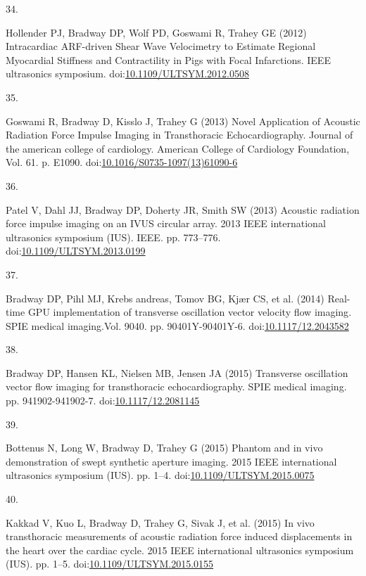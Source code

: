 \documentclass[
]{article}
\newlength{\cslhangindent}
\newlength{\csllabelwidth}
\newlength{\cslentryspacingunit} %
\newenvironment{CSLReferences}[2] %
 {%
  \setlength{\parindent}{0pt}
  \ifodd #1
  \let\oldpar\par
  \def\par{\hangindent=\cslhangindent\oldpar}
  \fi
  \setlength{\parskip}{#2\cslentryspacingunit}
 }%
 {}
\newcommand{\CSLLeftMargin}[1]{\parbox[t]{\csllabelwidth}{#1}}
\newcommand{\CSLRightInline}[1]{\parbox[t]{\linewidth - \csllabelwidth}{#1}\break}
\begin{document}
\begin{CSLReferences}{0}{0}
\leavevmode{}%
\CSLLeftMargin{34. }
\CSLRightInline{Hollender PJ, Bradway DP, Wolf PD, Goswami R, Trahey GE
(2012) {Intracardiac ARF-driven Shear Wave Velocimetry to Estimate
Regional Myocardial Stiffness and Contractility in Pigs with Focal
Infarctions}. IEEE ultrasonics symposium.
doi:\href{https://doi.org/10.1109/ULTSYM.2012.0508}{10.1109/ULTSYM.2012.0508}}

\leavevmode{}%
\CSLLeftMargin{35. }
\CSLRightInline{Goswami R, Bradway D, Kisslo J, Trahey G (2013) {Novel
Application of Acoustic Radiation Force Impulse Imaging in Transthoracic
Echocardiography}. Journal of the american college of cardiology.
American College of Cardiology Foundation, Vol. 61. p. E1090.
doi:\href{https://doi.org/10.1016/S0735-1097(13)61090-6}{10.1016/S0735-1097(13)61090-6}}

\leavevmode{}%
\CSLLeftMargin{36. }
\CSLRightInline{Patel V, Dahl JJ, Bradway DP, Doherty JR, Smith SW
(2013) {Acoustic radiation force impulse imaging on an IVUS circular
array}. 2013 IEEE international ultrasonics symposium (IUS). IEEE. pp.
773--776.
doi:\href{https://doi.org/10.1109/ULTSYM.2013.0199}{10.1109/ULTSYM.2013.0199}}

\leavevmode{}%
\CSLLeftMargin{37. }
\CSLRightInline{Bradway DP, Pihl MJ, Krebs andreas, Tomov BG, Kjær CS,
et al. (2014) {Real-time GPU implementation of transverse oscillation
vector velocity flow imaging}. SPIE medical imaging.Vol. 9040. pp.
90401Y-90401Y-6.
doi:\href{https://doi.org/10.1117/12.2043582}{10.1117/12.2043582}}

\leavevmode{}%
\CSLLeftMargin{38. }
\CSLRightInline{Bradway DP, Hansen KL, Nielsen MB, Jensen JA (2015)
{Transverse oscillation vector flow imaging for transthoracic
echocardiography}. SPIE medical imaging. pp. 941902-941902-7.
doi:\href{https://doi.org/10.1117/12.2081145}{10.1117/12.2081145}}

\leavevmode{}%
\CSLLeftMargin{39. }
\CSLRightInline{Bottenus N, Long W, Bradway D, Trahey G (2015) Phantom
and in vivo demonstration of swept synthetic aperture imaging. 2015 IEEE
international ultrasonics symposium (IUS). pp. 1--4.
doi:\href{https://doi.org/10.1109/ULTSYM.2015.0075}{10.1109/ULTSYM.2015.0075}}

\leavevmode{}%
\CSLLeftMargin{40. }
\CSLRightInline{Kakkad V, Kuo L, Bradway D, Trahey G, Sivak J, et al.
(2015) In vivo transthoracic measurements of acoustic radiation force
induced displacements in the heart over the cardiac cycle. 2015 IEEE
international ultrasonics symposium (IUS). pp. 1--5.
doi:\href{https://doi.org/10.1109/ULTSYM.2015.0155}{10.1109/ULTSYM.2015.0155}}


\end{CSLReferences}
\end{document}
